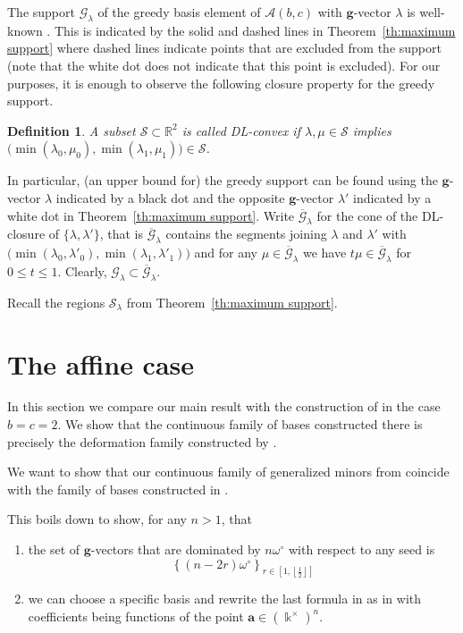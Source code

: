 \documentclass{amsart}
\newtheorem{definition}[theorem]{Definition}
\numberwithin{theorem}{section}
\newcommand{\bfa}{\boldsymbol{a}}
\newcommand{\bfg}{\boldsymbol{g}}
\newcommand{\cA}{\mathcal{A}}
\newcommand{\cG}{\mathcal{G}}
\newcommand{\cS}{\mathcal{S}}
\newcommand{\RR}{\mathbb{R}}
\newcommand{\kk}{\Bbbk}
\begin{document}
  The support $\cG_\lambda$ of the greedy basis element of $\cA(b,c)$ with $\bfg$-vector $\lambda$ is well-known \cite{LLZ,cgmmrsw}.
  This is indicated by the solid and dashed lines in Theorem~\ref{th:maximum support} where dashed lines indicate points that are excluded from the support (note that the white dot does not indicate that this point is excluded).
  For our purposes, it is enough to observe the following closure property for the greedy support.
  \begin{definition}
    A subset $\cS\subset\RR^2$ is called \emph{DL-convex} if $\lambda,\mu\in\cS$ implies $\big(\min(\lambda_0,\mu_0),\min(\lambda_1,\mu_1)\big)\in\cS$.
  \end{definition}
  In particular, (an upper bound for) the greedy support can be found using the $\bfg$-vector $\lambda$ indicated by a black dot and the opposite $\bfg$-vector $\lambda'$ indicated by a white dot in Theorem~\ref{th:maximum support}.
  Write $\overline{\cG}_\lambda$ for the cone of the DL-closure of $\{\lambda,\lambda'\}$, that is $\overline{\cG}_\lambda$ contains the segments joining $\lambda$ and $\lambda'$ with $\big(\min(\lambda_0,\lambda'_0),\min(\lambda_1,\lambda'_1)\big)$ and for any $\mu\in\overline{\cG}_\lambda$ we have $t\mu\in\overline{\cG}_\lambda$ for $0\le t\le 1$.
  Clearly, $\cG_\lambda\subset\overline{\cG}_\lambda$.

  Recall the regions $\cS_\lambda$ from Theorem~\ref{th:maximum support}.



\section{The affine case}
\label{sec:affine}

  In this section we compare our main result with the construction of \cite{RSW19} in the case $b=c=2$.
  We show that the continuous family of bases constructed there is precisely the deformation family constructed by \cite{Qin}.


  We want to show that our continuous family of generalized minors from \cite[Theorem 4.6]{RSW19} coincide with the family of bases constructed in \cite[Theorem 1.2.1]{Qin19}.
  
  This boils down to show, for any $n>1$, that
  \begin{enumerate}
    \item 
      the set of $\bfg$-vectors that are dominated by $n\omega^\circ$ with respect to any seed is 
      \[
        \left\{(n-2r)\omega^\circ \right\}_{r\in\left[1,\left\lfloor\frac{1}{2}\right\rfloor\right]}
      \]
  
    \item
      we can choose a specific basis and rewrite the last formula in \cite[Proposition 4.4]{RSW19} as in \cite[Theorem 1.2.1]{Qin19} with coefficients being functions of the point $\bfa\in(\kk^\times)^n$. 
  \end{enumerate}
  
\end{document}
